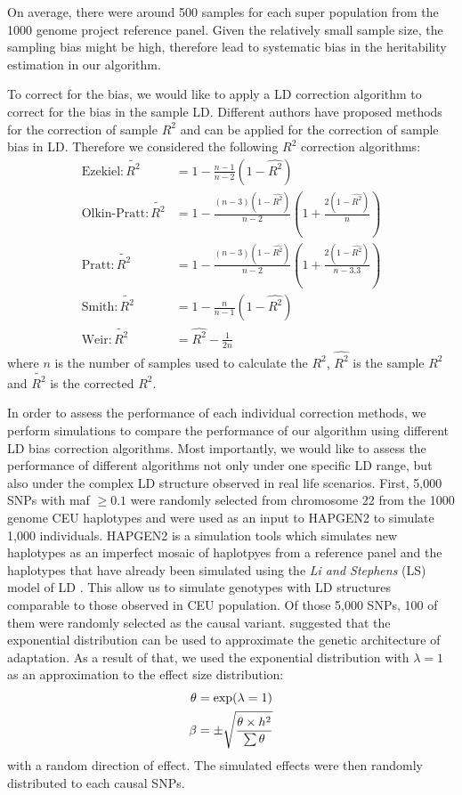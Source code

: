		On average, there were around 500 samples for each super population from the 1000 genome project reference panel.
		Given the relatively small sample size, the sampling bias might be high, therefore lead to systematic bias in the heritability estimation in our algorithm.
		
		To correct for the bias, we would like to apply a \gls{LD} correction algorithm to correct for the bias in the sample \gls{LD}.
		Different authors \citep{Weir1980,Wang2007} have proposed methods for the correction of sample $R^2$ and can be applied for the correction of sample bias in \gls{LD}.
		Therefore we considered the following $R^2$ correction algorithms:
		\begin{align}
		\text{Ezekiel}: \tilde{R^2}&= 1-\frac{n-1}{n-2}(1-\hat{R^2})\label{eq:ezekiel} \\
		\text{Olkin-Pratt}: \tilde{R^2}&=1-\frac{(n-3)(1-\hat{R^2})}{n-2}(1+\frac{2(1-\hat{R^2})}{n})\label{eq:okin} \\
		\text{Pratt}: \tilde{R^2}&=1-\frac{(n-3)(1-\hat{R^2})}{n-2}(1+\frac{2(1-\hat{R^2})}{n-3.3})\label{eq:pratt} \\
		\text{Smith}: \tilde{R^2}&=1-\frac{n}{n-1}(1-\hat{R^2}) \label{eq:smith}\\
		\text{Weir}: \tilde{R^2}&=\hat{R^2}-\frac{1}{2n} \label{eq:weir}
		\end{align}
		where $n$ is the number of samples used to calculate the $R^2$, $\hat{R^2}$ is the sample $R^2$ and $\tilde{R^2}$ is the corrected $R^2$.
		
		In order to assess the performance of each individual correction methods, we perform simulations to compare the performance of our algorithm using different \gls{LD} bias correction algorithms.
		Most importantly, we would like to assess the performance of different algorithms not only under one specific \gls{LD} range, but also under the complex \gls{LD} structure observed in real life scenarios.
		First, 5,000 \glspl{SNP} with \gls{maf} $\ge0.1$ were randomly selected from chromosome 22 from the 1000 genome \gls{CEU} haplotypes and were used as an input to HAPGEN2 \citep{Su2011} to simulate 1,000 individuals.
		HAPGEN2 is a simulation tools which simulates new haplotypes as an imperfect mosaic of haplotpyes from a reference panel and the haplotypes that have already been simulated using the \textit{Li and Stephens} (LS) model of \gls{LD} \citep{Li2003}.
		This allow us to simulate genotypes with \gls{LD} structures comparable to those observed in \gls{CEU} population. 
		Of those 5,000 \glspl{SNP}, 100 of them were randomly selected as the causal variant. 
		\citet{Orr1998} suggested that the exponential distribution can be used to approximate the genetic architecture of adaptation. 
		As a result of that, we used the exponential distribution with $\lambda=1$ as an approximation to the effect size distribution:
		\begin{align}
		\theta&=\mathrm{exp}(\lambda=1)\notag\\
		\beta&=\pm\sqrt{\frac{\theta \times h^2}{\sum \theta}}
		\label{eq:randomEffect}
		\end{align}
		with a random direction of effect.
		The simulated effects were then randomly distributed to each causal \glspl{SNP}.
			
